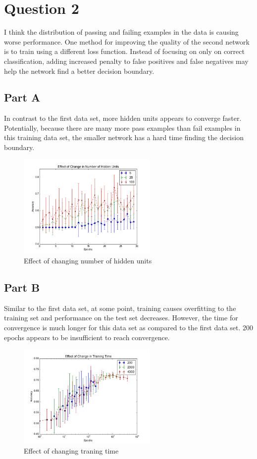 \section{Question 2}
I think the distribution of passing and failing examples in the data is causing worse performance.  One method for improving the quality of the second network is to train using a different loss function.  Instead of focusing on only on correct classification, adding increased penalty to false positives and false negatives may help the network find a better decision boundary.

\subsection{Part A}
In contrast to the first data set, more hidden units appears to converge faster.  Potentially, because there are many more pass examples than fail examples in this training data set, the smaller network has a hard time finding the decision boundary.  
\begin{figure}[H]
	\centering
	\includegraphics[width=0.6\textwidth]{../train2/hidden_units.png}
	\caption{Effect of changing number of hidden units}
\end{figure}

\subsection{Part B}
Similar to the first data set, at some point, training causes overfitting to the training set and performance on the test set decreases.  However, the time for convergence is much longer for this data set as compared to the first data set.  200 epochs appears to be insufficient to reach convergence.
\begin{figure}[H]
	\centering
	\includegraphics[width=0.6\textwidth]{../train2/epochs.png}
	\caption{Effect of changing traning time}
\end{figure}

